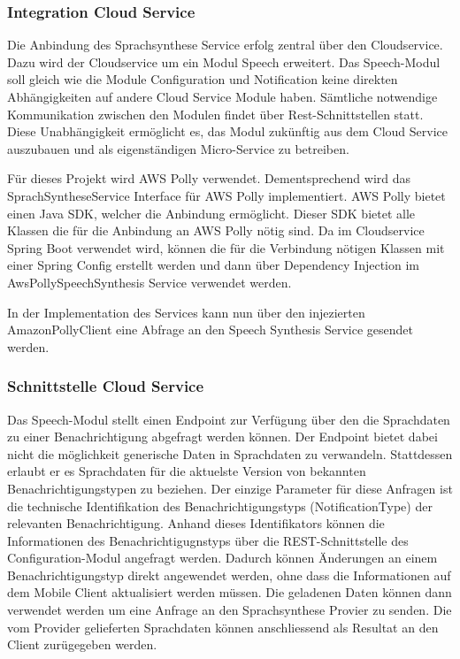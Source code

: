 \clearpage

\subsubsection{Integration Cloud Service }

Die Anbindung des Sprachsynthese Service erfolg zentral über den Cloudservice.
Dazu wird der Cloudservice um ein Modul Speech erweitert.
Das Speech-Modul soll gleich wie die Module Configuration und Notification keine direkten Abhängigkeiten auf andere Cloud Service Module haben.
Sämtliche notwendige Kommunikation zwischen den Modulen findet über Rest-Schnittstellen statt.
Diese Unabhängigkeit ermöglicht es, das Modul zukünftig aus dem Cloud Service auszubauen und als eigenständigen Micro-Service zu betreiben.



Für dieses Projekt wird AWS Polly verwendet.
Dementsprechend wird das SprachSyntheseService Interface für AWS Polly implementiert.
AWS Polly bietet einen Java SDK, welcher die Anbindung ermöglicht.
Dieser SDK bietet alle Klassen die für die Anbindung an AWS Polly nötig sind.
Da im Cloudservice Spring Boot verwendet wird, können die für die Verbindung nötigen Klassen mit einer Spring Config erstellt werden
und dann über Dependency Injection im AwsPollySpeechSynthesis Service verwendet werden.



In der Implementation des Services kann nun über den injezierten AmazonPollyClient eine Abfrage an den Speech Synthesis Service gesendet werden.

\clearpage

\subsubsection{Schnittstelle Cloud Service}

Das Speech-Modul stellt einen Endpoint zur Verfügung über den die Sprachdaten zu einer Benachrichtigung abgefragt werden können.
Der Endpoint bietet dabei nicht die möglichkeit generische Daten in Sprachdaten zu verwandeln.
Stattdessen erlaubt er es Sprachdaten für die aktuelste Version von bekannten Benachrichtigungstypen zu beziehen.
Der einzige Parameter für diese Anfragen ist die technische Identifikation des Benachrichtigungstyps (NotificationType) der relevanten Benachrichtigung.
Anhand dieses Identifikators können die Informationen des Benachrichtigugnstyps über die REST-Schnittstelle des Configuration-Modul angefragt werden.
Dadurch können Änderungen an einem Benachrichtigungstyp direkt angewendet werden, ohne dass die Informationen auf dem Mobile Client aktualisiert werden müssen.
Die geladenen Daten können dann verwendet werden um eine Anfrage an den Sprachsynthese Provier zu senden.
Die vom Provider gelieferten Sprachdaten können anschliessend als Resultat an den Client zurügegeben werden.

